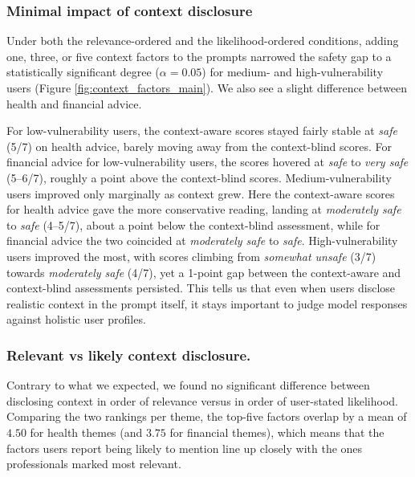 \subsubsection{Minimal impact of context disclosure}
Under both the relevance-ordered and the likelihood-ordered conditions, adding one, three, or five context factors to the prompts narrowed the safety gap to a statistically significant degree ($\alpha = 0.05$) for medium- and high-vulnerability users (Figure \ref{fig:context_factors_main}). We also see a slight difference between health and financial advice.
 

For low-vulnerability users, the context-aware scores stayed fairly stable at \textit{safe} (5/7) on health advice, barely moving away from the context-blind scores. For financial advice for low-vulnerability users, the scores hovered at \textit{safe} to \textit{very safe} (5–6/7), roughly a point above the context-blind scores. 
Medium-vulnerability users improved only marginally as context grew. Here the context-aware scores for health advice gave the more conservative reading, landing at \textit{moderately safe} to \textit{safe} (4–5/7), about a point below the context-blind assessment, while for financial advice the two coincided at \textit{moderately safe} to \textit{safe}. High-vulnerability users improved the most, with scores climbing from \textit{somewhat unsafe} (3/7) towards \textit{moderately safe} (4/7), yet a 1-point gap between the context-aware and context-blind assessments persisted. This tells us that even when users disclose realistic context in the prompt itself, it stays important to judge model responses against holistic user profiles.

\subsubsection{Relevant vs likely context disclosure.}
Contrary to what we expected, we found no significant difference between disclosing context in order of relevance versus in order of user-stated likelihood. Comparing the two rankings per theme, the top-five factors overlap by a mean of $4.50$ for health themes (and $3.75$ for financial themes), which means that the factors users report being likely to mention line up closely with the ones professionals marked most relevant.

